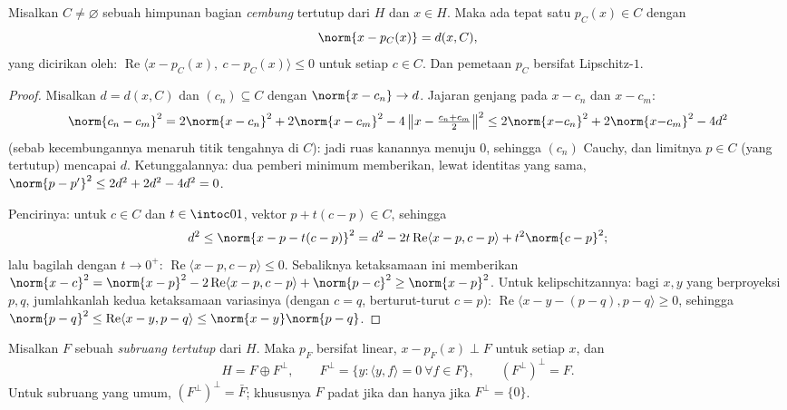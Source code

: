 \begin{theorem}
\label{thm:b3:hilbert:projection}
Misalkan $C \neq \varnothing$ sebuah himpunan bagian \emph{cembung} tertutup dari
 $H$ dan $x \in H$. Maka ada tepat satu $p_C(x)
\in C$ dengan
\[
\norm{x - p_C(x)} = d(x, C),
\]
yang dicirikan oleh: $\operatorname{Re}\langle x - p_C(x),\ c -
p_C(x)\rangle \leq 0$ untuk setiap $c \in C$. Dan pemetaan $p_C$ bersifat
Lipschitz-$1$.
\end{theorem}

\begin{proof}
Misalkan $d = d(x, C)$ dan $(c_n) \subseteq C$ dengan $\norm{x - c_n}
\to d$. Jajaran genjang pada $x - c_n$ dan $x - c_m$:
\[
\norm{c_n - c_m}^2 = 2\norm{x - c_n}^2 + 2\norm{x - c_m}^2 -
4\,\bigl\|x - \tfrac{c_n + c_m}2\bigr\|^2
\leq 2\norm{x{-}c_n}^2 + 2\norm{x{-}c_m}^2 - 4d^2
\]
(sebab kecembungannya menaruh titik tengahnya di $C$): jadi ruas kanannya menuju
$0$, sehingga $(c_n)$ Cauchy, dan limitnya $p \in C$ (yang tertutup)
mencapai $d$. Ketunggalannya: dua pemberi minimum memberikan, lewat identitas
yang sama, $\norm{p - p'}^2 \leq 2d^2 + 2d^2 - 4d^2 = 0$.

Pencirinya: untuk $c \in C$ dan $t \in \intoc01$, vektor
$p + t(c - p) \in C$, sehingga
\[
d^2 \leq \norm{x - p - t(c-p)}^2
= d^2 - 2t\operatorname{Re}\langle x - p, c - p\rangle +
t^2\norm{c-p}^2 ;
\]
lalu bagilah dengan $t \to 0^+$: $\operatorname{Re}\langle x - p, c -
p\rangle \leq 0$. Sebaliknya ketaksamaan ini memberikan $\norm{x -
c}^2 = \norm{x - p}^2 - 2\operatorname{Re}\langle x - p, c -
p\rangle + \norm{p - c}^2 \geq \norm{x-p}^2$. Untuk kelipschitzannya: bagi
$x, y$ yang berproyeksi $p, q$, jumlahkanlah kedua
ketaksamaan variasinya (dengan $c = q$, berturut-turut $c = p$):
$\operatorname{Re}\langle x - y - (p - q), p - q\rangle \geq
0$, sehingga $\norm{p - q}^2 \leq \operatorname{Re}\langle x - y, p -
q\rangle \leq \norm{x - y}\norm{p - q}$.
\end{proof}

\begin{theorem}
\label{thm:b3:hilbert:decomposition}
Misalkan $F$ sebuah \emph{subruang tertutup} dari $H$. Maka $p_F$ bersifat
linear, $x - p_F(x) \perp F$ untuk setiap $x$, dan
\[
H = F \oplus F^\perp,
\qquad F^\perp = \{y : \langle y, f\rangle = 0\ \forall f\in
F\},
\qquad (F^\perp)^\perp = F .
\]
Untuk subruang yang umum, $(F^\perp)^\perp = \bar F$; khususnya
$F$ padat jika dan hanya jika $F^\perp = \{0\}$.
\end{theorem}

